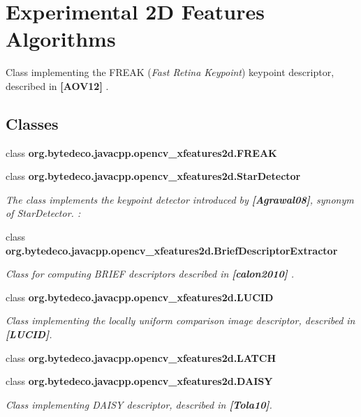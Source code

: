 \hypertarget{group__xfeatures2d__experiment}{}\section{Experimental 2D Features Algorithms}
\label{group__xfeatures2d__experiment}


Class implementing the F\+R\+E\+AK ({\itshape Fast Retina Keypoint}) keypoint descriptor, described in {\bfseries [A\+O\+V12]} .  


\subsection*{Classes}
\begin{DoxyCompactItemize}
\item 
class {\bfseries org.\+bytedeco.\+javacpp.\+opencv\+\_\+xfeatures2d.\+F\+R\+E\+AK}
\item 
class {\bfseries org.\+bytedeco.\+javacpp.\+opencv\+\_\+xfeatures2d.\+Star\+Detector}
\begin{DoxyCompactList}\small\item\em The class implements the keypoint detector introduced by {\bfseries [Agrawal08]}, synonym of Star\+Detector. \+: \end{DoxyCompactList}\item 
class {\bfseries org.\+bytedeco.\+javacpp.\+opencv\+\_\+xfeatures2d.\+Brief\+Descriptor\+Extractor}
\begin{DoxyCompactList}\small\item\em Class for computing B\+R\+I\+EF descriptors described in {\bfseries [calon2010]} . \end{DoxyCompactList}\item 
class {\bfseries org.\+bytedeco.\+javacpp.\+opencv\+\_\+xfeatures2d.\+L\+U\+C\+ID}
\begin{DoxyCompactList}\small\item\em Class implementing the locally uniform comparison image descriptor, described in {\bfseries [L\+U\+C\+ID]}. \end{DoxyCompactList}\item 
class {\bfseries org.\+bytedeco.\+javacpp.\+opencv\+\_\+xfeatures2d.\+L\+A\+T\+CH}
\item 
class {\bfseries org.\+bytedeco.\+javacpp.\+opencv\+\_\+xfeatures2d.\+D\+A\+I\+SY}
\begin{DoxyCompactList}\small\item\em Class implementing D\+A\+I\+SY descriptor, described in {\bfseries [Tola10]}. \end{DoxyCompactList}\item 

\end{DoxyCompactItemize}
